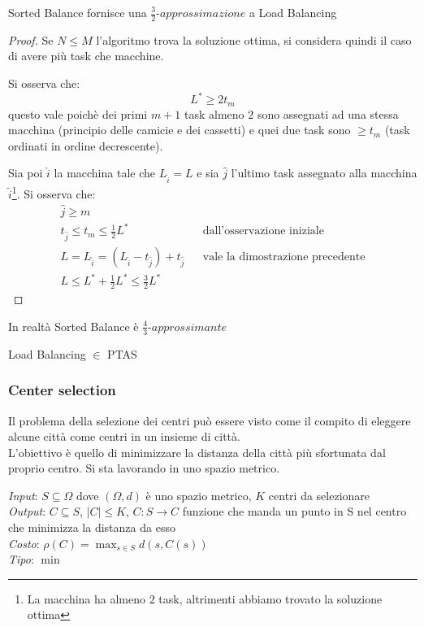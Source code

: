 \begin{theorem}
    Sorted Balance fornisce una $\frac{3}{2}\textit{-approssimazione}$  a Load Balancing
\end{theorem}
\begin{proof}
    Se $N\leq M$ l'algoritmo trova la soluzione ottima, si considera quindi il caso di 
    avere più task che macchine.
    
    Si osserva che: $$L^* \geq 2t_m$$ questo vale poichè dei primi $m+1$ task
    almeno $2$ sono assegnati ad una stessa macchina (principio delle camicie e dei 
    cassetti) e quei due task sono $\geq t_m$ (task ordinati in ordine decrescente).
    
    Sia poi $\hat{i}$ la macchina tale che $L_{\hat{i}} = L$ e sia 
    $\hat{j}$ l'ultimo task assegnato alla macchina $\hat{i}$\footnote{La macchina ha almeno $2$ task, 
    altrimenti abbiamo trovato la soluzione ottima}.
    Si osserva che: 
    \begin{equation}
        \begin{aligned}        
            \hat{j} \geq m\\
            t_{\hat{j}} \leq t_m  \leq \frac{1}{2}L^* && \text{dall'osservazione iniziale}\\
            L = L_{\hat{i}} = (L_{\hat{i}} - t_{\hat{j}}) + t_{\hat{j}} && \text{vale la dimostrazione precedente}\\
            L \leq L^* + \frac{1}{2}L^* \leq \frac{3}{2}L^*
        \end{aligned}
    \end{equation}
\end{proof}
\begin{remark}
    In realtà Sorted Balance è $\frac{4}{3}\textit{-approssimante}$
\end{remark}
\begin{remark}
    Load Balancing $\in$ PTAS
\end{remark}

\subsubsection{Center selection}
Il problema della selezione dei centri può essere visto come il compito 
di eleggere alcune città come centri in un insieme di città. 
\\L'obiettivo è quello di minimizzare la distanza della città più sfortunata
dal proprio centro. Si sta lavorando in uno spazio metrico.

\emph{Input}: $S \subseteq \Omega$ dove $(\Omega, d)$ è uno spazio metrico, $K$ centri da selezionare\\
\emph{Output}: $C \subseteq S$, $|C| \leq K$, $C : S \longrightarrow C$ funzione che manda 
un punto in S nel centro che minimizza la distanza da esso\\
\emph{Costo}: $\rho(C) = \max_{s \in S}d(s,C(s))$ \\
\emph{Tipo}: $\min$

